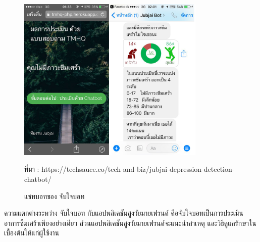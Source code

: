 \newpage
\begin{figure}[H]
	\centering
	\includegraphics[width=0.8\textwidth]{Figures/2/ref2}
	\caption{แชทบอทของ จับใจบอท}{ที่มา : https://techsauce.co/tech-and-biz/jubjai-depression-detection-chatbot/}
	\label{Fig:ref2}
\end{figure}

ความแตกต่างระหว่าง จับใจบอท กับแอปพลิเคชันสูงวัยมายเฟรนด์ คือจับใจบอทเป็นการประเมินอาการซึมเศร้าเพียงอย่างเดียว ส่วนแอปพลิเคชันสูงวัยมายเฟรนด์จะแนะนำสาเหตุ และวิธีดูแลรักษาในเบื้องต้นให้แก่ผู้ใช้งาน


